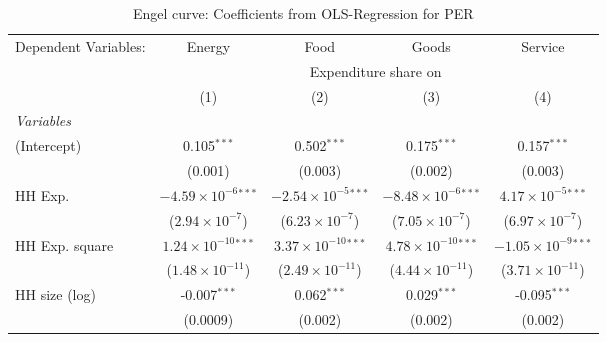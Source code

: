 
\begin{table}[htbp!]
   \centering
   \small
   \begin{adjustbox}{width = 1\textwidth, max height = 0.95\textheight, center}
      \begin{threeparttable}[b]
         \caption{\label{tab:Engel_parametric_PER} Engel curve: Coefficients from OLS-Regression for PER}
         \begin{tabular}{lcccc}
            \tabularnewline \midrule \midrule
            Dependent Variables: & Energy                         & Food                           & Goods                          & Service\\  
             & \multicolumn{4}{c}{Expenditure share on} \\ 
                                 & (1)                            & (2)                            & (3)                            & (4)\\  
            \midrule
            \emph{Variables}\\
            (Intercept)          & 0.105$^{***}$                  & 0.502$^{***}$                  & 0.175$^{***}$                  & 0.157$^{***}$\\   
                                 & (0.001)                        & (0.003)                        & (0.002)                        & (0.003)\\   
            HH Exp.              & $-4.59\times 10^{-6}$$^{***}$  & $-2.54\times 10^{-5}$$^{***}$  & $-8.48\times 10^{-6}$$^{***}$  & $4.17\times 10^{-5}$$^{***}$\\    
                                 & ($2.94\times 10^{-7}$)         & ($6.23\times 10^{-7}$)         & ($7.05\times 10^{-7}$)         & ($6.97\times 10^{-7}$)\\    
            HH Exp. square       & $1.24\times 10^{-10}$$^{***}$  & $3.37\times 10^{-10}$$^{***}$  & $4.78\times 10^{-10}$$^{***}$  & $-1.05\times 10^{-9}$$^{***}$\\    
                                 & ($1.48\times 10^{-11}$)        & ($2.49\times 10^{-11}$)        & ($4.44\times 10^{-11}$)        & ($3.71\times 10^{-11}$)\\    
            HH size (log)        & -0.007$^{***}$                 & 0.062$^{***}$                  & 0.029$^{***}$                  & -0.095$^{***}$\\   
                                 & (0.0009)                       & (0.002)                        & (0.002)                        & (0.002)\\   

\end{tabular}
\end{threeparttable}
\end{adjustbox}
\end{table}
